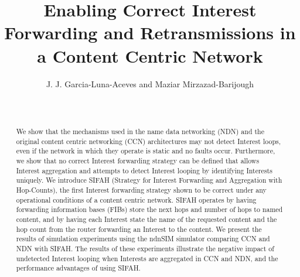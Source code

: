 \documentclass{ancs15-alternate}
\begin{document}
\title{
Enabling Correct Interest Forwarding and Retransmissions in a Content Centric Network} 

\author{
    \alignauthor
       J. J. Garcia-Luna-Aceves  and Maziar Mirzazad-Barijough\\
       \\
              \\
}
 
\maketitle



\begin{abstract}
We show that the mechanisms used in the name data networking (NDN) and the original content centric networking (CCN)  architectures may not detect Interest loops, even if the network in which they operate is  static and no faults occur. Furthermore, we show that no correct Interest forwarding strategy can be defined that allows Interest aggregation and attempts to
detect Interest looping by identifying Interests uniquely.  We introduce SIFAH (Strategy for Interest  Forwarding and Aggregation with Hop-Counts), the first Interest forwarding strategy shown to be correct under any operational conditions of a content centric network. SIFAH operates by  having forwarding information bases (FIBs) store the next hops and number of hops to named content, and by having each Interest state  the name of the requested content and the hop count from the router forwarding an Interest to the content.   We present the results of simulation experiments using the ndnSIM simulator comparing CCN and NDN with SIFAH. The results of these experiments illustrate the negative impact of undetected Interest looping when Interests are aggregated in CCN and NDN, and the performance advantages of using SIFAH.

\end{abstract}



\vspace{-0.08in}

\vspace{-0.08in}

\vspace{-0.08in}
\end{document}
